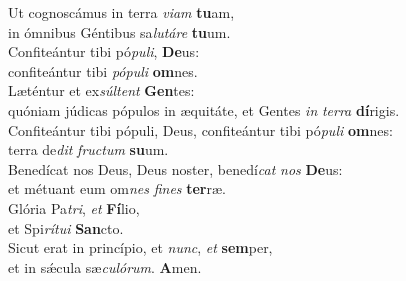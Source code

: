 \evenverse Ut cognoscámus in terra \textit{vi}\textit{am} \textbf{tu}am,~\*\\
\evenverse in ómnibus Géntibus sa\textit{lu}\textit{tá}\textit{re} \textbf{tu}um.\\
\oddverse Confiteántur tibi pó\textit{pu}\textit{li}, \textbf{De}us:~\*\\
\oddverse confiteántur tibi \textit{pó}\textit{pu}\textit{li} \textbf{om}nes.\\
\evenverse Læténtur et ex\textit{súl}\textit{tent} \textbf{Gen}tes:~\*\\
\evenverse quóniam júdicas pópulos in æquitáte, et Gentes \textit{in} \textit{ter}\textit{ra} \textbf{dí}rigis.\\
\oddverse Confiteántur tibi pópuli, Deus, confiteántur tibi pó\textit{pu}\textit{li} \textbf{om}nes:~\*\\
\oddverse terra de\textit{dit} \textit{fru}\textit{ctum} \textbf{su}um.\\
\evenverse Benedícat nos Deus, Deus noster, benedí\textit{cat} \textit{nos} \textbf{De}us:~\*\\
\evenverse et métuant eum om\textit{nes} \textit{fi}\textit{nes} \textbf{ter}ræ.\\
\oddverse Glória Pa\textit{tri}, \textit{et} \textbf{Fí}lio,~\*\\
\oddverse et Spi\textit{rí}\textit{tu}\textit{i} \textbf{San}cto.\\
\evenverse Sicut erat in princípio, et \textit{nunc}, \textit{et} \textbf{sem}per,~\*\\
\evenverse et in sǽcula sæ\textit{cu}\textit{ló}\textit{rum}. \textbf{A}men.\\

